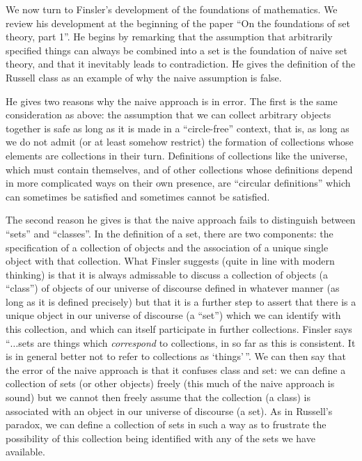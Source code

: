 We now turn to Finsler's development of the foundations of
mathematics.  We review his development at the beginning of the paper
``On the foundations of set theory, part 1''.  He begins by remarking
that the assumption that arbitrarily specified things can always be
combined into a set is the foundation of naive set theory, and that it
inevitably leads to contradiction.  He gives the definition of the
Russell class as an example of why the naive assumption is false.

He gives two reasons why the naive approach is in error.  The first is
the same consideration as above: the assumption that we can collect
arbitrary objects together is safe as long as it is made in a
``circle-free'' context, that is, as long as we do not admit (or at
least somehow restrict) the formation of collections whose elements
are collections in their turn.  Definitions of collections like the
universe, which must contain themselves, and of other collections
whose definitions depend in more complicated ways on their own
presence, are ``circular definitions'' which can sometimes be
satisfied and sometimes cannot be satisfied.

The second reason he gives is that the naive approach fails to
distinguish between ``sets'' and ``classes''.  In the definition of a
set, there are two components: the specification of a collection of
objects and the association of a unique single object with that
collection.  What Finsler suggests (quite in line with modern
thinking) is that it is always admissable to discuss a collection of
objects (a ``class'') of objects of our universe of discourse defined
in whatever manner (as long as it is defined precisely) but that it is
a further step to assert that there is a unique object in our universe
of discourse (a ``set'') which we can identify with this collection,
and which can itself participate in further collections.  Finsler says
``$\ldots$sets are things which {\em correspond\/} to collections, in
so far as this is consistent.  It is in general better not to refer to
collections as `things'\,''.  We can then say that the error of the
naive approach is that it confuses class and set: we can define a
collection of sets (or other objects) freely (this much of the naive
approach is sound) but we cannot then freely assume that the
collection (a class) is associated with an object in our universe of
discourse (a set).  As in Russell's paradox, we can define a
collection of sets in such a way as to frustrate the possibility of
this collection being identified with any of the sets we have
available.

